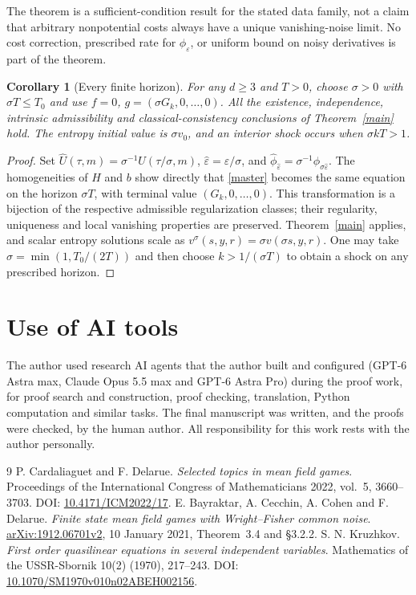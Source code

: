 \documentclass[11pt]{article}
\newtheorem{corollary}{Corollary}
\newcommand{\eps}{\varepsilon}
\begin{document}
The theorem is a sufficient-condition result for the stated data family, not a claim that arbitrary nonpotential costs always have a unique vanishing-noise limit. No cost correction, prescribed rate for $\phi_\eps$, or uniform bound on noisy derivatives is part of the theorem.

\begin{corollary}[Every finite horizon]\label{allhorizons}
For any $d\ge3$ and $T>0$, choose $\sigma>0$ with $\sigma T\le T_0$ and use $f=0$, $g=(\sigma G_k,0,\ldots,0)$. All the existence, independence, intrinsic admissibility and classical-consistency conclusions of Theorem~\ref{main} hold. The entropy initial value is $\sigma v_0$, and an interior shock occurs when $\sigma kT>1$.
\end{corollary}
\begin{proof}
Set $\widehat U(\tau,m)=\sigma^{-1}U(\tau/\sigma,m)$, $\widehat\eps=\eps/\sigma$, and
$\widehat\phi_{\widehat\eps}=\sigma^{-1}\phi_{\sigma\widehat\eps}$. The homogeneities of $H$ and $b$ show directly that \eqref{master} becomes the same equation on the horizon $\sigma T$, with terminal value $(G_k,0,\ldots,0)$. This transformation is a bijection of the respective admissible regularization classes; their regularity, uniqueness and local vanishing properties are preserved. Theorem~\ref{main} applies, and scalar entropy solutions scale as $v^\sigma(s,y,r)=\sigma v(\sigma s,y,r)$. One may take $\sigma=\min(1,T_0/(2T))$ and then choose $k>1/(\sigma T)$ to obtain a shock on any prescribed horizon.
\end{proof}

\section*{Use of AI tools}
The author used research AI agents that the author built and configured (GPT-6 Astra max,
Claude Opus 5.5 max and GPT-6 Astra Pro) during the proof work, for proof search and
construction, proof checking, translation, Python computation and similar tasks. The final
manuscript was written, and the proofs were checked, by the human author. All responsibility
for this work rests with the author personally.

\begin{thebibliography}{9}
\small
{} P. Cardaliaguet and F. Delarue.
\emph{Selected topics in mean field games}.
Proceedings of the International Congress of Mathematicians 2022, vol.~5, 3660--3703.
DOI: \href{https://doi.org/10.4171/ICM2022/17}{10.4171/ICM2022/17}.
 E. Bayraktar, A. Cecchin, A. Cohen and F. Delarue.
\emph{Finite state mean field games with Wright--Fisher common noise}.
\href{https://arxiv.org/pdf/1912.06701v2}{arXiv:1912.06701v2}, 10 January 2021, Theorem~3.4 and \S3.2.2.
 S. N. Kruzhkov.
\emph{First order quasilinear equations in several independent variables}.
Mathematics of the USSR-Sbornik 10(2) (1970), 217--243.
DOI: \href{https://doi.org/10.1070/SM1970v010n02ABEH002156}{10.1070/SM1970v010n02ABEH002156}.
\end{thebibliography}
\end{document}
